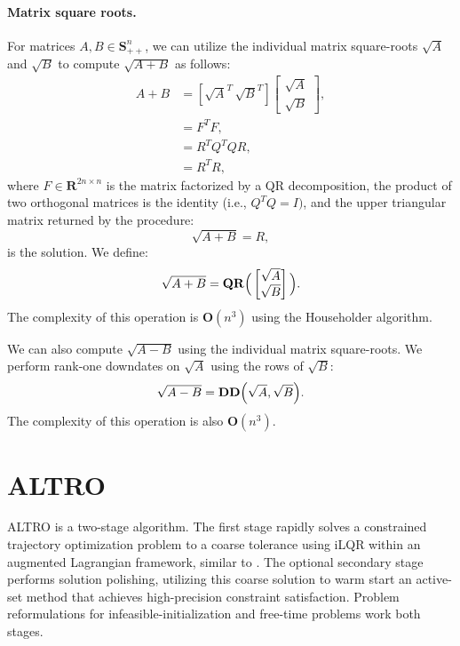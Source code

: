 \paragraph{Matrix square roots.}
For matrices $A, B \in \mathbf{S}_{++}^{n}$, we can utilize the individual matrix square-roots $\sqrt{A}$ and  $\sqrt{B}$ to compute $\sqrt{A + B}$ as follows:
\begin{align}
	A + B &= [\sqrt{A}^T\, \sqrt{B}^T]\begin{bmatrix} \sqrt{A} \\ \sqrt{B} \end{bmatrix},\\
	&= F^T F, \\
	&= R^T Q^T Q R, \\
	&= R^T R, 
\end{align}
where $F \in \mathbf{R}^{2n \times n}$ is the matrix factorized by a QR decomposition, the product of two orthogonal matrices is the identity (i.e., $Q^T Q = I)$, and the upper triangular matrix returned by the procedure:
\begin{equation}
\sqrt{A + B} = R,
\end{equation} 
is the solution. We define:
\begin{equation}
	\sqrt{A + B} = \mbox{\textbf{QR}}\Big(\begin{bmatrix} \sqrt{A} \\ \sqrt{B} \end{bmatrix}\Big).
\end{equation}
The complexity of this operation is $\mathbf{O}(n^3)$ using the Householder algorithm.

We can also compute $\sqrt{A - B}$ using the individual matrix square-roots. We perform rank-one downdates on $\sqrt{A}$ using the rows of $\sqrt{B}$:
\begin{equation}
	\sqrt{A - B} = \mbox{\textbf{DD}}\Big(\sqrt{A}, \sqrt{B}\Big).
\end{equation}
The complexity of this operation is also $\mathbf{O}(n^3)$.

\section{ALTRO} \label{altro_algorithm}
ALTRO is a two-stage algorithm. The first stage rapidly solves a constrained trajectory optimization problem to a coarse tolerance using iLQR within an augmented Lagrangian framework, similar to \cite{plancher2017constrained}. The optional secondary stage performs solution polishing, utilizing this coarse solution to warm start an active-set method that achieves high-precision constraint satisfaction. Problem reformulations for infeasible-initialization and free-time problems work both stages.

